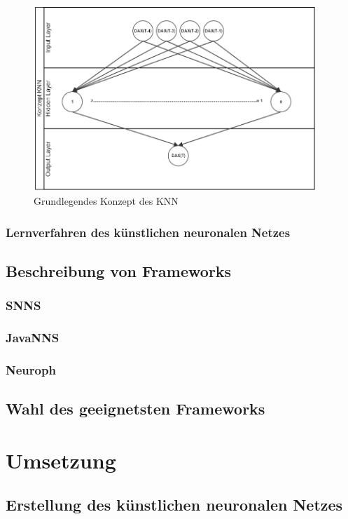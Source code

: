 \documentclass[a4paper,DIV11,bibliography=totoc,headings=normal,ngerman,headsepline,listof=totoc,parskip=half]{scrreprt}
\begin{document}
\begin{figure}[H]
\centering
		\includegraphics[width=0.95\textwidth]{KonzeptKNN.PNG}
	\caption{Grundlegendes Konzept des KNN}
	\label{fig:Grundlegendes Konzept des KNN}
\end{figure}

\subsection{Lernverfahren des künstlichen neuronalen Netzes} %
\section{Beschreibung von Frameworks} %
\subsection{SNNS} %
\subsection{JavaNNS}  %
\subsection{Neuroph} %
\section{Wahl des geeignetsten Frameworks} %
\chapter{Umsetzung} %
\section{Erstellung des künstlichen neuronalen Netzes} %
\end{document}
